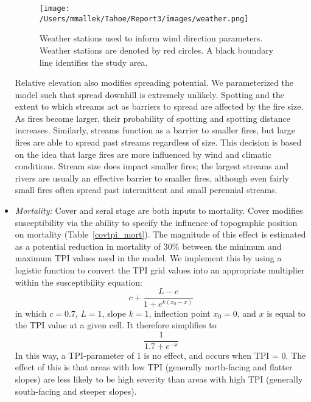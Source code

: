 \begin{itemize}
\begin{figure}[htbp]
\centering
\texttt{[image: /Users/mmallek/Tahoe/Report3/images/weather.png]}
\caption{Weather stations used to inform wind direction parameters. Weather stations are denoted by red circles. A black boundary line identifies the study area.}
\label{weather}
\end{figure}

Relative elevation also modifies spreading potential. We parameterized the model such that spread downhill is extremely unlikely. Spotting and the extent to which streams act as barriers to spread are affected by the fire size. As fires become larger, their probability of spotting and spotting distance increases. Similarly, streams function as a barrier to smaller fires, but large fires are able to spread past streams regardless of size. This decision is based on the idea that large fires are more influenced by wind and climatic conditions. Stream size does impact smaller fires; the largest streams and rivers are usually an effective barrier to smaller fires, although even fairly small fires often spread past intermittent and small perennial streams. 


\item \emph{Mortality:} Cover and seral stage are both inputs to mortality. Cover modifies susceptibility via the ability to specify the influence of topographic position on mortality (Table~\ref{covtpi_mort}). The magnitude of this effect is estimated as a potential reduction in mortality of 30\% between the minimum and maximum TPI values used in the model. We implement this by using a logistic function to convert the TPI grid values into an appropriate multiplier within the susceptibility equation:
$$c + \frac{L-c}{1+e^{k(x_0-x)}}$$
in which $c= 0.7$, $L=1$, slope $k=1$, inflection point $x_0=0$, and $x$ is equal to the TPI value at a given cell. It therefore simplifies to 
$$\frac{1}{1.7+e^{-x}}$$
In this way, a TPI-parameter of 1 is no effect, and occurs when TPI = 0. The effect of this is that areas with low TPI (generally north-facing and flatter slopes) are less likely to be high severity than areas with high TPI (generally south-facing and steeper slopes).


\end{itemize}
